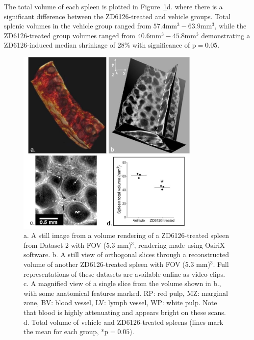 \documentclass[12pt]{article}
\begin{document}
The total volume of each spleen is plotted in Figure~\ref{fig:3}d. where there is a significant difference between the ZD6126-treated and vehicle groups. Total splenic volumes in the vehicle group ranged from $57.4\text{mm}^3 − 63.9\text{mm}^3$, while the ZD6126-treated group volumes ranged from $40.6\text{mm}^3 − 45.8\text{mm}^3$ demonstrating a ZD6126-induced median shrinkage of 28\% with significance of $\text{p}=0.05$.

\begin{figure}%
	\centering
	\includegraphics[width=0.8\textwidth]{Figure3.jpg}
	\caption{a. A still image from a volume rendering of a ZD6126-treated spleen from Dataset 2 with FOV (5.3 mm)$^3$, rendering made using OsiriX software. \cite{rossetosirix:2004}  b. A still view of orthogonal slices through a reconstructed volume of another ZD6126-treated spleen with FOV (5.3 mm)$^3$.  Full representations of these datasets are available online as video clips. c. A magnified view of a single slice from the volume shown in b., with some anatomical features marked. RP: red pulp, MZ: marginal zone, BV: blood vessel, LV: lymph vessel, WP: white pulp. Note that blood is highly attenuating and appears bright on these scans. d. Total volume of vehicle and ZD6126-treated spleens (lines mark the mean for each group, *$\text{p}=0.05$).}
	\label{fig:3}
\end{figure}
\end{document}
